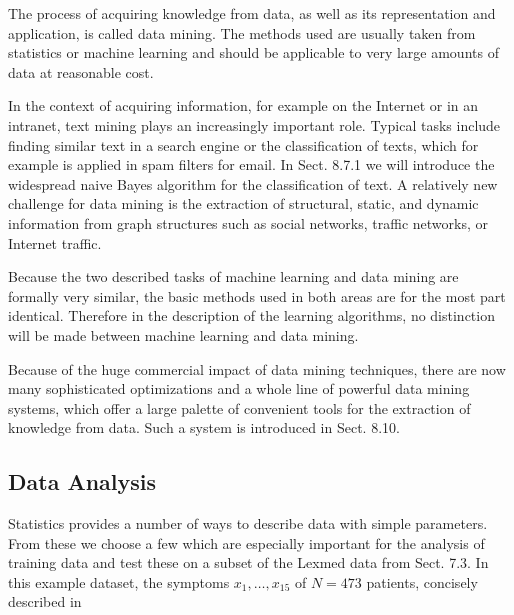 \documentclass[10pt]{book}
\begin{document}
\begin{displayquote}
The process of acquiring knowledge from data, as well as its representation and application, is called data mining. The methods used are usually taken from statistics or machine learning and should be applicable to very large amounts of data at reasonable cost.
\end{displayquote}

In the context of acquiring information, for example on the Internet or in an intranet, text mining plays an increasingly important role. Typical tasks include finding similar text in a search engine or the classification of texts, which for example is applied in spam filters for email. In Sect. 8.7.1 we will introduce the widespread naive Bayes algorithm for the classification of text. A relatively new challenge for data mining is the extraction of structural, static, and dynamic information from graph structures such as social networks, traffic networks, or Internet traffic.

Because the two described tasks of machine learning and data mining are formally very similar, the basic methods used in both areas are for the most part identical. Therefore in the description of the learning algorithms, no distinction will be made between machine learning and data mining.

Because of the huge commercial impact of data mining techniques, there are now many sophisticated optimizations and a whole line of powerful data mining systems, which offer a large palette of convenient tools for the extraction of knowledge from data. Such a system is introduced in Sect. 8.10.

\subsection*{Data Analysis}
Statistics provides a number of ways to describe data with simple parameters. From these we choose a few which are especially important for the analysis of training data and test these on a subset of the Lexmed data from Sect. 7.3. In this example dataset, the symptoms $x_{1}, \ldots, x_{15}$ of $N=473$ patients, concisely described in
\end{document}
